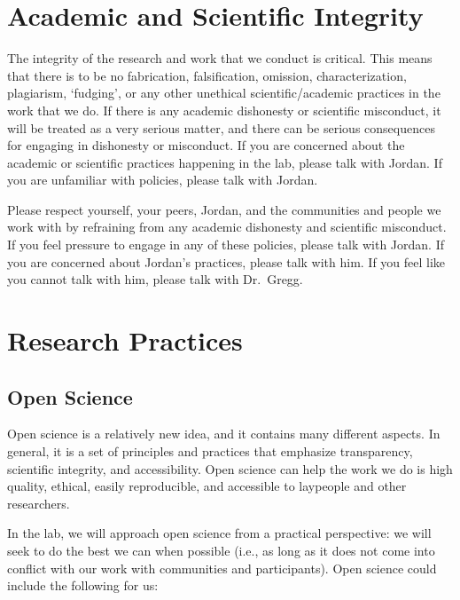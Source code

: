 \documentclass[
]{book}
\begin{document}
\hypertarget{academic-and-scientific-integrity}{%
\section{Academic and Scientific Integrity}\label{academic-and-scientific-integrity}}

The integrity of the research and work that we conduct is critical. This means that there is to be no fabrication, falsification, omission, characterization, plagiarism, `fudging', or any other unethical scientific/academic practices in the work that we do. If there is any academic dishonesty or scientific misconduct, it will be treated as a very serious matter, and there can be serious consequences for engaging in dishonesty or misconduct. If you are concerned about the academic or scientific practices happening in the lab, please talk with Jordan. If you are unfamiliar with policies, please talk with Jordan.

Please respect yourself, your peers, Jordan, and the communities and people we work with by refraining from any academic dishonesty and scientific misconduct. If you feel pressure to engage in any of these policies, please talk with Jordan. If you are concerned about Jordan's practices, please talk with him. If you feel like you cannot talk with him, please talk with Dr.~Gregg.

\hypertarget{research-practices}{%
\section{Research Practices}\label{research-practices}}

\hypertarget{open-science}{%
\subsection{Open Science}\label{open-science}}

Open science is a relatively new idea, and it contains many different aspects. In general, it is a set of principles and practices that emphasize transparency, scientific integrity, and accessibility. Open science can help the work we do is high quality, ethical, easily reproducible, and accessible to laypeople and other researchers.

In the lab, we will approach open science from a practical perspective: we will seek to do the best we can when possible (i.e., as long as it does not come into conflict with our work with communities and participants). Open science could include the following for us:
\end{document}
